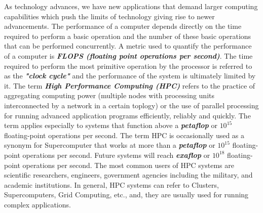 As technology advances, we have new applications that demand larger computing capabilities which push the limits of technology giving rise to newer advancements. The performance of a computer depends directly on the time required to perform a basic operation and the number of these basic operations that can be performed concurrently. A metric used to quantify the performance of a computer is \textbf{\textit{FLOPS (floating point operations per second)}}. The time required to perform the most primitive operation by the processor is referred to as the \textbf{\textit{"clock cycle"}} and the performance of the system is ultimately limited by it. The term \textbf{\textit{High Performance Computing (HPC)}} refers to the practice of aggregating computing power (multiple nodes with processing units interconnected by a network in a certain toplogy) or the use of parallel processing for running advanced application programs efficiently, reliably and quickly. The term applies especially to systems that function above a \textbf{\textit{petaflop}} or \textbf{\textit{$10^{15}$}} floating-point operations per second. The term HPC is occasionally used as a synonym for Supercomputer that works at more than a \textbf{\textit{petaflop}} or \textbf{\textit{$10^{15}$}} floating-point operations per second. Future systems will reach \textbf{\textit{exaflop}} or \textbf{\textit{$10^{18}$}} floating-point operations per second. The most common users of HPC systems are scientific researchers, engineers, government agencies including the military, and academic institutions. In general, HPC systems can refer to Clusters, Supercomputers, Grid Computing, etc., and, they are usually used for running complex applications.\\ \par
\noindent
